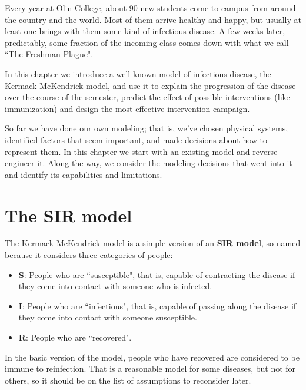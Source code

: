 \documentclass[12pt]{book}
\theoremstyle{exercise}
\begin{document}
Every year at Olin College, about 90 new students come to campus from around the country and the world.  Most of them arrive healthy and happy, but usually at least one brings with them some kind of infectious disease.  A few weeks later, predictably, some fraction of the incoming class comes down with what we call ``The Freshman Plague".


In this chapter we introduce a well-known model of infectious disease, the Kermack-McKendrick model, and use it to explain the progression of the disease over the course of the semester, predict the effect of possible interventions (like immunization) and design the most effective intervention campaign.


So far we have done our own modeling; that is, we've chosen physical systems, identified factors that seem important, and made decisions about how to represent them.  In this chapter we start with an existing model and reverse-engineer it.  Along the way, we consider the modeling decisions that went into it and identify its capabilities and limitations.


\section{The SIR model}

The Kermack-McKendrick model is a simple version of an {\bf SIR model}, so-named because it considers three categories of people:

\begin{itemize}

\item {\bf S}: People who are ``susceptible", that is, capable of contracting the disease if they come into contact with someone who is infected.

\item {\bf I}: People who are ``infectious", that is, capable of passing along the disease if they come into contact with someone susceptible.

\item {\bf R}: People who are ``recovered".

\end{itemize}
 
In the basic version of the model, people who have recovered are considered to be immune to reinfection.  That is a reasonable model for some diseases, but not for others, so it should be on the list of assumptions to reconsider later.
\end{document}
